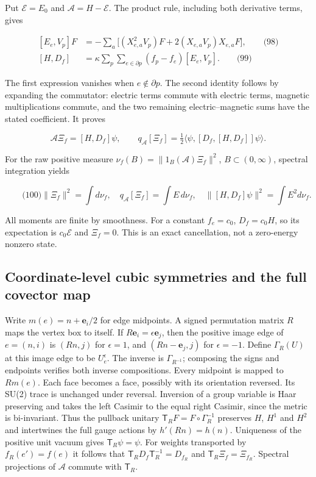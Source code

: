 Put \(\mathcal E=E_0\) and \(\mathcal A=H-\mathcal E\). The product
rule, including both derivative terms, gives

\[
\begin{aligned}
 [E_e,V_p]F&=-\sum_a\bigl[(X_{e,a}^2V_p)F+
                           2(X_{e,a}V_p)X_{e,a}F\bigr],\qquad\text{(98)}\\
 [H,D_f]&=\kappa\sum_p\sum_{e\in\partial p}(f_p-f_e)[E_e,V_p].
 \qquad\text{(99)}
\end{aligned}
\]

The first expression vanishes when \(e\notin\partial p\). The second
identity follows by expanding the commutator: electric terms commute
with electric terms, magnetic multiplications commute, and the two
remaining electric--magnetic sums have the stated coefficient. It proves

\[
\mathcal A\Xi_f=[H,D_f]\psi,\qquad
 q_{\mathcal A}[\Xi_f]=\tfrac12
 \langle\psi,[D_f,[H,D_f]]\psi\rangle .
\]

For the raw positive measure \(\nu_f(B)=\|1_B(\mathcal A)\Xi_f\|^2\),
\(B\subset(0,\infty)\), spectral integration yields

\[
\qquad\text{(100)}
 \|\Xi_f\|^2=\int d\nu_f,\quad
 q_{\mathcal A}[\Xi_f]=\int E\,d\nu_f,\quad
 \|[H,D_f]\psi\|^2=\int E^2d\nu_f .
\]

All moments are finite by smoothness. For a constant \(f_e=c_0\),
\(D_f=c_0H\), so its expectation is \(c_0\mathcal E\) and \(\Xi_f=0\).
This is an exact cancellation, not a zero-energy nonzero state.

\subsection{Coordinate-level cubic symmetries and the full covector
map}\label{fabel-tensor-transfer-md-coordinate-level-cubic-symmetries-and-the-full-covector-map}

Write \(m(e)=n+\mathbf e_i/2\) for edge midpoints. A signed permutation
matrix \(R\) maps the vertex box to itself. If
\(R\mathbf e_i=\epsilon\mathbf e_j\), then the positive image edge of
\(e=(n,i)\) is \((Rn,j)\) for \(\epsilon=1\), and \((Rn-\mathbf e_j,j)\)
for \(\epsilon=-1\). Define \(\Gamma_R(U)\) at this image edge to be
\(U_e^\epsilon\). The inverse is \(\Gamma_{R^{-1}}\); composing the
signs and endpoints verifies both inverse compositions. Every midpoint
is mapped to \(Rm(e)\). Each face becomes a face, possibly with its
orientation reversed. Its SU(2) trace is unchanged under reversal.
Inversion of a group variable is Haar preserving and takes the left
Casimir to the equal right Casimir, since the metric is bi-invariant.
Thus the pullback unitary \(\mathsf T_RF=F\circ\Gamma_R^{-1}\) preserves
\(H\), \(H^1\) and \(H^2\) and intertwines the full gauge actions by
\(h'(Rn)=h(n)\). Uniqueness of the positive unit vacuum gives
\(\mathsf T_R\psi=\psi\). For weights transported by \(f_R(e')=f(e)\) it
follows that \(\mathsf T_RD_f\mathsf T_R^{-1}=D_{f_R}\) and
\(\mathsf T_R\Xi_f=\Xi_{f_R}\). Spectral projections of \(\mathcal A\)
commute with \(\mathsf T_R\).

